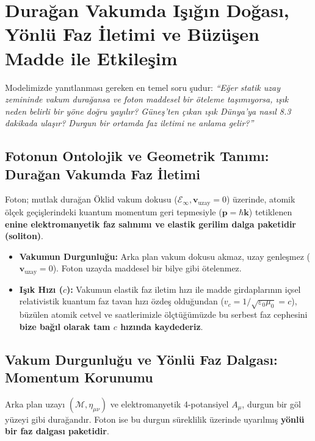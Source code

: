 \section{Durağan Vakumda Işığın Doğası, Yönlü Faz İletimi ve Büzüşen Madde ile Etkileşim}
\label{sec:isik_yonlu_yayilim}

Modelimizde yanıtlanması gereken en temel soru şudur: \textit{``Eğer statik uzay zemininde vakum durağansa ve foton maddesel bir öteleme taşımıyorsa, ışık neden belirli bir yöne doğru yayılır? Güneş'ten çıkan ışık Dünya'ya nasıl 8.3 dakikada ulaşır? Durgun bir ortamda faz iletimi ne anlama gelir?''}

\subsection{Fotonun Ontolojik ve Geometrik Tanımı: Durağan Vakumda Faz İletimi}
\label{sec:foton_tanim}

\begin{definition}
    \label{def:foton_tanimi_main}
    Foton; mutlak durağan Öklid vakum dokusu ($\mathcal{E}_\infty, \mathbf{v}_{\mathrm{uzay}}=0$) üzerinde, atomik ölçek geçişlerindeki kuantum momentum geri tepmesiyle ($\mathbf{p} = \hbar \mathbf{k}$) tetiklenen \textbf{enine elektromanyetik faz salınımı ve elastik gerilim dalga paketidir (soliton)}.
    \begin{itemize}
        \item \textbf{Vakumun Durgunluğu:} Arka plan vakum dokusu akmaz, uzay genleşmez ($\mathbf{v}_{\mathrm{uzay}} = 0$). Foton uzayda maddesel bir bilye gibi ötelenmez.
        \item \textbf{Işık Hızı ($c$):} Vakumun elastik faz iletim hızı ile madde girdaplarının içsel relativistik kuantum faz tavan hızı özdeş olduğundan ($v_c = 1/\sqrt{\varepsilon_0\mu_0} = c$), büzülen atomik cetvel ve saatlerimizle ölçtüğümüzde bu serbest faz cephesini \textbf{bize bağıl olarak tam $c$ hızında kaydederiz}.
    \end{itemize}
\end{definition}

\subsection{Vakum Durgunluğu ve Yönlü Faz Dalgası: Momentum Korunumu}
Arka plan uzayı $(\mathcal{M}, \eta_{\mu\nu})$ ve elektromanyetik 4-potansiyel $A_\mu$, durgun bir göl yüzeyi gibi durağandır. Foton ise bu durgun süreklilik üzerinde uyarılmış \textbf{yönlü bir faz dalgası paketidir}.

